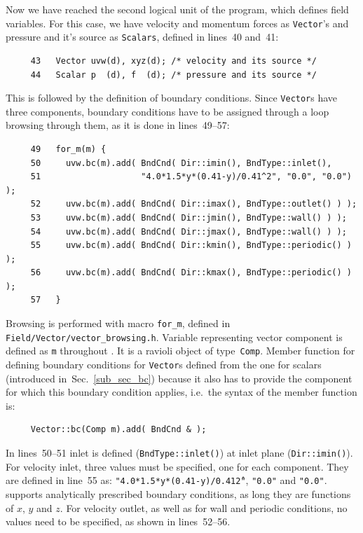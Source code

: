 Now we have reached the second logical unit of the program, which defines
field variables. For this case, we have velocity and momentum forces
as {\tt Vector}'s and pressure and it's source as {\tt Scalars}, defined
in lines~40 and~41:
%
{\small \begin{verbatim}
     43   Vector uvw(d), xyz(d); /* velocity and its source */
     44   Scalar p  (d), f  (d); /* pressure and its source */
\end{verbatim}}
%
This is followed by the definition of boundary conditions. Since {\tt Vector}s
have three components, boundary conditions have to be assigned through a loop
browsing through them, as it is done in lines~49--57:
%
{\small \begin{verbatim}
     49   for_m(m) {
     50     uvw.bc(m).add( BndCnd( Dir::imin(), BndType::inlet(),
     51                    "4.0*1.5*y*(0.41-y)/0.41^2", "0.0", "0.0") );
     52     uvw.bc(m).add( BndCnd( Dir::imax(), BndType::outlet() ) );
     53     uvw.bc(m).add( BndCnd( Dir::jmin(), BndType::wall() ) );
     54     uvw.bc(m).add( BndCnd( Dir::jmax(), BndType::wall() ) );
     55     uvw.bc(m).add( BndCnd( Dir::kmin(), BndType::periodic() ) );
     56     uvw.bc(m).add( BndCnd( Dir::kmax(), BndType::periodic() ) );
     57   }
\end{verbatim}}
%
Browsing is performed with macro {\tt for\_m}, defined in {\tt Field/Vector/vector\_browsing.h}.
Variable representing vector component is defined as {\tt m} throughout {\psiboil}. It is a
ravioli object of type~{\tt Comp}.
Member function for defining boundary conditions for {\tt Vector}s defined from the one for
scalars (introduced in~Sec.~\ref{sub_sec_bc}) because it also has to provide the component for
which this boundary condition applies, i.e.\ the syntax of the member function is:
%
{\small \begin{verbatim}
     Vector::bc(Comp m).add( BndCnd & );
\end{verbatim}}
%
In lines~50--51 inlet is defined ({\tt BndType::inlet()}) at inlet plane ({\tt Dir::imin()}).
For velocity inlet, three values must be specified, one for each component. They are
defined in line~55 as: {\tt "4.0*1.5*y*(0.41-y)/0.41\^2"}, {\tt "0.0"} and {\tt "0.0"}.
{\psiboil} supports analytically prescribed boundary conditions, as long they are
functions of $x$, $y$ and $z$. For velocity outlet, as well as for wall and periodic
conditions, no values need to be specified, as shown in lines~52--56.

